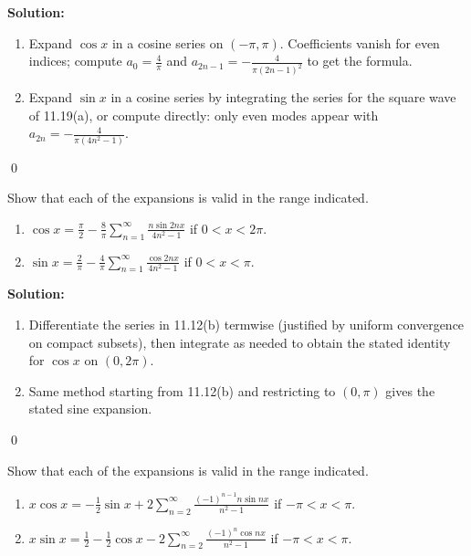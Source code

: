 \noindent\textbf{Solution:}
\begin{enumerate}[label=(\alph*)]
\item Expand $\cos x$ in a cosine series on $(-\pi,\pi)$. Coefficients vanish for even indices; compute $a_0=\tfrac{4}{\pi}$ and $a_{2n-1}=-\tfrac{4}{\pi(2n-1)^2}$ to get the formula.
\item Expand $\sin x$ in a cosine series by integrating the series for the square wave of 11.19(a), or compute directly: only even modes appear with $a_{2n}= -\tfrac{4}{\pi(4n^2-1)}$.
\end{enumerate}\qed


\begin{problembox}
Show that each of the expansions is valid in the range indicated.
\begin{enumerate}[label=(\alph*)]
\item $\cos x = \frac{\pi}{2} - \frac{8}{\pi} \sum_{n=1}^\infty \frac{n \sin 2nx}{4n^2 - 1}$ if $0 < x < 2\pi$.
\item $\sin x = \frac{2}{\pi} - \frac{4}{\pi} \sum_{n=1}^\infty \frac{\cos 2nx}{4n^2 - 1}$ if $0 < x < \pi$.
\end{enumerate}
\end{problembox}

\noindent\textbf{Solution:}
\begin{enumerate}[label=(\alph*)]
\item Differentiate the series in 11.12(b) termwise (justified by uniform convergence on compact subsets), then integrate as needed to obtain the stated identity for $\cos x$ on $(0,2\pi)$.
\item Same method starting from 11.12(b) and restricting to $(0,\pi)$ gives the stated sine expansion.
\end{enumerate}\qed


\begin{problembox}
Show that each of the expansions is valid in the range indicated.
\begin{enumerate}[label=(\alph*)]
\item $x \cos x = -\frac{1}{2} \sin x + 2 \sum_{n=2}^\infty \frac{(-1)^{n-1} n \sin nx}{n^2 - 1}$ if $-\pi < x < \pi$.
\item $x \sin x = \frac{1}{2} - \frac{1}{2} \cos x - 2 \sum_{n=2}^\infty \frac{(-1)^n \cos nx}{n^2 - 1}$ if $-\pi < x < \pi$.
\end{enumerate}
\end{problembox}

